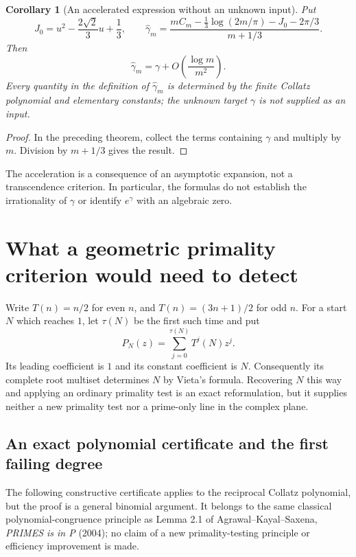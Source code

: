 \documentclass[11pt,a4paper]{article}
\newtheorem{corollary}[theorem]{Corollary}
\theoremstyle{definition}
\theoremstyle{remark}
\numberwithin{equation}{section}
\begin{document}
\begin{corollary}[An accelerated expression without an unknown input]
\label{C:cor:gamma-accelerated-expression}
Put
\[
 J_0=u^2-\frac{2\sqrt2}{3}u+\frac13,
 \qquad
 \widehat\gamma_m=
 \frac{mC_m-\frac13\log(2m/\pi)-J_0-2\pi/3}{m+1/3}.
\]
Then
\[
 \widehat\gamma_m=\gamma
          +O\!\left(\frac{\log m}{m^2}\right).
\]
Every quantity in the definition of $\widehat\gamma_m$ is determined
by the finite Collatz polynomial and elementary constants; the
unknown target $\gamma$ is not supplied as an input.
\end{corollary}
\begin{proof}
In the preceding theorem, collect the terms containing $\gamma$ and
multiply by $m$.  Division by $m+1/3$ gives the result.
\end{proof}

The acceleration is a consequence of an asymptotic expansion, not a
transcendence criterion.  In particular, the formulas do not establish
the irrationality of $\gamma$ or identify $e^\gamma$ with an algebraic
zero.


\section{What a geometric primality criterion would need to detect}

Write $T(n)=n/2$ for even $n$, and $T(n)=(3n+1)/2$ for odd $n$.
For a start $N$ which reaches $1$, let $\tau(N)$ be the first such time and put
\[
 P_N(z)=\sum_{j=0}^{\tau(N)}T^j(N)z^j.
\]
Its leading coefficient is $1$ and its constant coefficient is $N$.
Consequently its complete root multiset determines $N$ by Vieta's formula.
Recovering $N$ this way and applying an ordinary primality test is an exact
reformulation, but it supplies neither a new primality test nor a prime-only
line in the complex plane.

\subsection{An exact polynomial certificate and the first failing degree}

The following constructive certificate applies to the reciprocal Collatz
polynomial, but the proof is a general binomial argument.  It belongs to the
same classical polynomial-congruence principle as Lemma 2.1 of
Agrawal--Kayal--Saxena, \emph{PRIMES is in P} (2004); no claim of a new
primality-testing principle or efficiency improvement is made.
\end{document}
